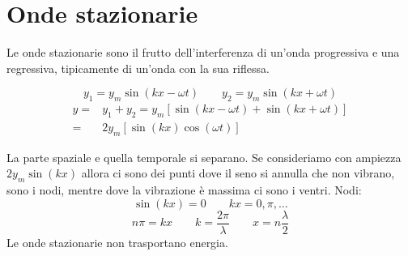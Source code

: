 \section{Onde stazionarie}
Le onde stazionarie sono il frutto dell'interferenza di un'onda progressiva e una regressiva, tipicamente di un'onda con la sua riflessa.

\parbox[]{\textwidth}{
\begin{equation*}
y_1=y_m\sin\left(kx-\omega t\right)\qquad y_2=y_m\sin\left(kx+\omega t\right)
\end{equation*}
\begin{align*}
y=&y_1+y_2=y_m\left[\sin\left(kx-\omega t\right)+\sin\left(kx+\omega t\right)\right]\\
=&2y_m\left[\sin\left(kx\right)\cos\left(\omega t\right)\right]
\end{align*}
}
La parte spaziale e quella temporale si separano. Se consideriamo con ampiezza $2y_m\sin\left(kx\right)$ allora ci sono dei punti dove il seno si annulla che non vibrano, sono i nodi, mentre dove la vibrazione è massima ci sono i ventri. Nodi:
\begin{equation*}\sin\left(kx\right)=0\qquad kx=0,\pi,\ldots\end{equation*}
\begin{equation*}n\pi=kx\qquad k=\frac{2\pi}{\lambda}\qquad x=n\frac{\lambda}{2}\end{equation*}
Le onde stazionarie non trasportano energia.
